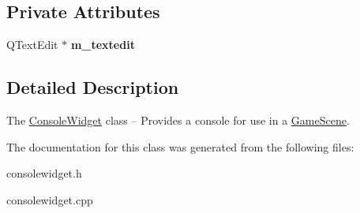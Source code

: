 \subsection*{Private Attributes}
\begin{DoxyCompactItemize}
\item 
\mbox{\label{class_console_widget_a8a1debe1a354c1d403b1deea7c25a0aa}} 
Q\+Text\+Edit $\ast$ {\bfseries m\+\_\+textedit}
\end{DoxyCompactItemize}


\subsection{Detailed Description}
The \hyperlink{class_console_widget}{Console\+Widget} class -- Provides a console for use in a \hyperlink{class_game_scene}{Game\+Scene}. 

The documentation for this class was generated from the following files\+:\begin{DoxyCompactItemize}
\item 
consolewidget.\+h\item 
consolewidget.\+cpp\end{DoxyCompactItemize}
